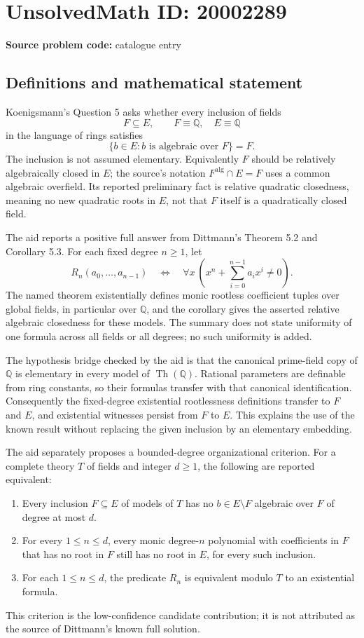 \documentclass[11pt]{article}
\newcommand{\Q}{\mathbb{Q}}
\begin{document}
\section*{UnsolvedMath ID: 20002289}
\textbf{Source problem code:} catalogue entry
\subsection{Definitions and mathematical statement}
Koenigsmann's Question 5 asks whether every inclusion of fields
\[
 F\subseteq E,\qquad F\equiv\Q,\quad E\equiv\Q
\]
in the language of rings satisfies
\[
 \{b\in E:b\text{ is algebraic over }F\}=F.
\]
The inclusion is not assumed elementary. Equivalently \(F\) should be relatively algebraically closed in \(E\); the source's notation \(F^{\mathrm{alg}}\cap E=F\) uses a common algebraic overfield. Its reported preliminary fact is relative quadratic closedness, meaning no new quadratic roots in \(E\), not that \(F\) itself is a quadratically closed field.

The aid reports a positive full answer from Dittmann's Theorem 5.2 and Corollary 5.3. For each fixed degree \(n\ge1\), let
\[
 R_n(a_0,\ldots,a_{n-1})\quad\Longleftrightarrow\quad
 \forall x\ \left(x^n+\sum_{i=0}^{n-1}a_ix^i\ne0\right).
\]
The named theorem existentially defines monic rootless coefficient tuples over global fields, in particular over \(\Q\), and the corollary gives the asserted relative algebraic closedness for these models. The summary does not state uniformity of one formula across all fields or all degrees; no such uniformity is added.

The hypothesis bridge checked by the aid is that the canonical prime-field copy of \(\Q\) is elementary in every model of \(\operatorname{Th}(\Q)\). Rational parameters are definable from ring constants, so their formulas transfer with that canonical identification. Consequently the fixed-degree existential rootlessness definitions transfer to \(F\) and \(E\), and existential witnesses persist from \(F\) to \(E\). This explains the use of the known result without replacing the given inclusion by an elementary embedding.

The aid separately proposes a bounded-degree organizational criterion. For a complete theory \(T\) of fields and integer \(d\ge1\), the following are reported equivalent:
\begin{enumerate}
\item Every inclusion \(F\subseteq E\) of models of \(T\) has no \(b\in E\setminus F\) algebraic over \(F\) of degree at most \(d\).
\item For every \(1\le n\le d\), every monic degree-\(n\) polynomial with coefficients in \(F\) that has no root in \(F\) still has no root in \(E\), for every such inclusion.
\item For each \(1\le n\le d\), the predicate \(R_n\) is equivalent modulo \(T\) to an existential formula.
\end{enumerate}
This criterion is the low-confidence candidate contribution; it is not attributed as the source of Dittmann's known full solution.
\end{document}
